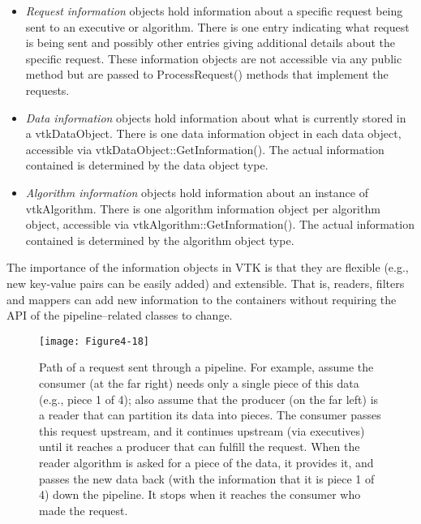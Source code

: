 \begin{description}[leftmargin=0cm,labelindent=0cm]
\begin{itemize}
\item \emph{Request information} objects hold information about a specific request being sent to an executive or algorithm. There is one entry indicating what request is being sent and possibly other entries giving additional details about the specific request. These information objects are not accessible via any public method but are passed to ProcessRequest() methods that implement the requests.

\item \emph{Data information} objects hold information about what is currently stored in a vtkDataObject. There is one data information object in each data object, accessible via vtkDataObject::GetInformation(). The actual information contained is determined by the data object type.

\item \emph{Algorithm information} objects hold information about an instance of vtkAlgorithm. There is one algorithm information object per algorithm object, accessible via vtkAlgorithm::GetInformation(). The actual information contained is determined by the algorithm object type.
\end{itemize}

The importance of the information objects in VTK is that they are flexible (e.g., new key-value pairs can be easily added) and extensible. That is, readers, filters and mappers can add new information to the containers without requiring the API of the pipeline--related classes to change.

\begin{figure}[!htb]
  \centering
  \texttt{[image: Figure4-18]}\\
  \caption{Path of a request sent through a pipeline. For example, assume the consumer (at the far right) needs only a single piece of this data (e.g., piece 1 of 4); also assume that the producer (on the far left) is a reader that can partition its data into pieces. The consumer passes this request upstream, and it continues upstream (via executives) until it reaches a producer that can fulfill the request. When the reader algorithm is asked for a piece of the data, it provides it, and passes the new data back (with the information that it is piece 1 of 4) down the pipeline. It stops when it reaches the consumer who made the request.}\label{fig:Figure4-18}
\end{figure}


\end{description}
